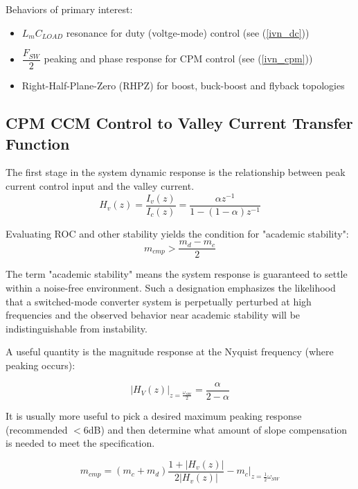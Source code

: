 \documentclass{scrartcl}
\begin{document}
	Behaviors of primary interest:
	\begin{itemize}
		\item $L_m C_{LOAD}$ resonance for duty (voltge-mode) control (see (\ref{ivn_dc}))
		\item $\dfrac{F_{SW}}{2}$ peaking and phase response for CPM control (see (\ref{ivn_cpm}))
		\item Right-Half-Plane-Zero (RHPZ) for boost, buck-boost and flyback topologies 
	\end{itemize}
	
		\subsection{CPM CCM Control to Valley Current Transfer Function}
		The first stage in the system dynamic response is the relationship between peak current control input and the valley current. 
		\begin{equation}
		H_v(z) = \frac {I_v(z)} {I_c(z)} = \frac {\alpha z^{-1}} {1 - (1-\alpha) z^{-1}}  \label{hvz}
		\end{equation}
			
		Evaluating ROC and other stability yields the condition for "academic stability":
		\begin{equation}
		m_{cmp} > \dfrac{m_d - m_c}{2} \label{slope_stab}
		\end{equation}
		
		The term "academic stability" means the system response is guaranteed to settle within a noise-free environment.  Such a designation emphasizes the likelihood that a switched-mode converter system is perpetually perturbed at high frequencies and the observed behavior near academic stability will be indistinguishable from instability.
		
		A useful quantity is the magnitude response at the Nyquist frequency (where peaking occurs):		
		
		\begin{equation}
		\bigg|H_V(z) \bigg|_{z=\frac{\omega_{SW}}{2}} =  \dfrac{\alpha}{2 - \alpha} \label{cpm_peaking}
		\end{equation}
		
		It is usually more useful to pick a desired maximum peaking response (recommended $<6$dB) and then determine what amount of slope compensation is needed to meet the specification.

		\begin{equation}
		m_{cmp} = (m_c + m_d) \frac{1 + |H_v(z)|}{2|H_v(z)|} - m_c \bigg|_{z=\frac{1}{2}\omega_{SW}}
		\end{equation}
		
\end{document}
